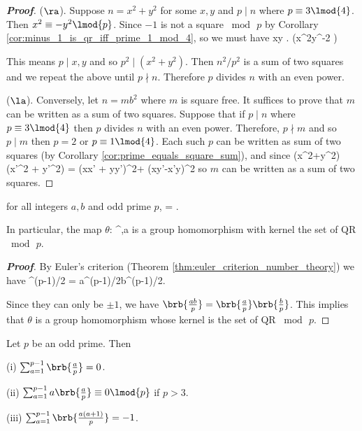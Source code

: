 \begin{proof}[\bf Proof]
($\ra$).  Suppose $n = x^2 + y^2$ for some $x,y$ and $p\mid n$ where $p\equiv 3\lmod{4}$. Then $x^2 \equiv -y^2\lmod{p}$. Since $-1$ is not a square $\bmod\, p$ by Corollary \ref{cor:minus_1_is_qr_iff_prime_1_mod_4}, so we must have
\be
x\equiv y . \qquad (x^2y^{-2}  )
\ee

This means $p\mid x,y$ and so $p^2 \mid (x^2+y^2)$. Then $n^2/p^2$ is a sum of two squares and we repeat the above until $p\nmid n$. Therefore $p$ divides $n$ with an even power.

($\la$). Conversely, let $n = mb^2$ where $m$ is square free. It suffices to prove that $m$ can be written as a sum of two squares. Suppose that if $p\mid n$ where $p \equiv 3\lmod{4}$ then $p$ divides $n$ with an even power. Therefore, $p\nmid m$ and so $p\mid m$ then $p=2$ or $p\equiv 1\lmod{4}$. Each such $p$ can be written as sum of two squares (by Corollary \ref{cor:prime_equals_square_sum}), and since
\be
(x^2+y^2)(x'^2 + y'^2) = (xx' + yy')^2+ (xy'-x'y)^2
\ee
so $m$ can be written as a sum of two squares.
\end{proof}



\begin{proposition}\label{pro:product_of_legendre_symbol}
for all integers $a,b$ and odd prime $p$,
\be
{} = .
\ee

In particular, the map $\theta$:
\be
{}^\times \to {},\quad a\mapsto {}
\ee
is a group homomorphism with kernel the set of QR $\bmod\, p$.
\end{proposition}

\begin{proof}[\bf Proof]
By Euler's criterion (Theorem \ref{thm:euler_criterion_number_theory}) we have
\be
{} \equiv {}^{(p-1)/2} = a^{(p-1)/2}b^{(p-1)/2}\equiv {}.
\ee

Since they can only be $\pm 1$, we have $\brb{\frac{ab}p} = \brb{\frac ap}\brb{\frac bp}$. This implies that $\theta$ is a group homomorphism whose kernel is the set of QR $\bmod \, p$.
\end{proof}


\begin{proposition}
Let $p$ be an odd prime. Then
\ben
\item [(i)] $\sum^{p-1}_{a=1}\brb{\frac ap} = 0$.
\item [(ii)] $\sum^{p-1}_{a=1}a\brb{\frac ap} \equiv 0\lmod{p}$ if $p>3$.
\item [(iii)] $\sum^{p-1}_{a=1}\brb{\frac{a(a+1)}p} = -1$.
\een
\end{proposition}

